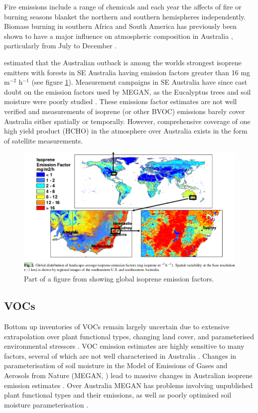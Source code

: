   Fire emissions include a range of chemicals and each year the affects of fire or burning seasons blanket the northern and southern hemispheres independently.
  Biomass burning in southern Africa and South America has previously been shown to have a major influence on atmospheric composition in Australia \citep{Oltmans2001, Gloudemans2006, Edwards2006}, particularly from July to December \citep{Pak2003, Liu2016}.
  
  \cite{Guenther2006} estimated that the Australian outback is among the worlds strongest isoprene emitters with forests in SE Australia having emission factors greater than 16 mg m$^{-2}$ h$^{-1}$ (see figure \ref{LR:Aus:fig_MEGAN_EF}).
  Measurement campaigns in SE Australia have since cast doubt on the emission factors used by MEGAN, as the Eucalyptus trees and soil moisture were poorly studied \cite{Emmerson2016}.
  These emissions factor estimates are not well verified and measurements of isoprene (or other BVOC) emissions barely cover Australia either spatially or temporally.
  However, comprehensive coverage of one high yield product (HCHO) in the atmosphere over Australia exists in the form of satellite measurements.
  
  \begin{figure}
    \includegraphics[width=\textwidth]{Figures/MeganIsoprene1.png}
    \caption{ Part of a figure from \cite{Guenther2006} showing global isoprene emission factors. }
    \label{LR:Aus:fig_MEGAN_EF}
  \end{figure}
  
  \subsection{VOCs}
    Bottom up inventories of VOCs remain largely uncertain due to extensive extrapolation over plant functional types, changing land cover, and parameterised environmental stressors \citep{Guenther2000,Kanakidou2005,Millet2006}.
    VOC emission estimates are highly sensitive to many factors, several of which are not well characterised in Australia \citep{Sindelarova2014, Bauwens2016}.
    Changes in parameterisation of soil moisture in the Model of Emissions of Gases and Aerosols from Nature (MEGAN, \cite{Guenther1995}) lead to massive changes in Australian isoprene emission estimates \citep{Sindelarova2014}.
    Over Australia MEGAN has problems involving unpublished plant functional types and their emissions, as well as poorly optimised soil moisture parameterisation \citep{Emmerson2016}.
    
